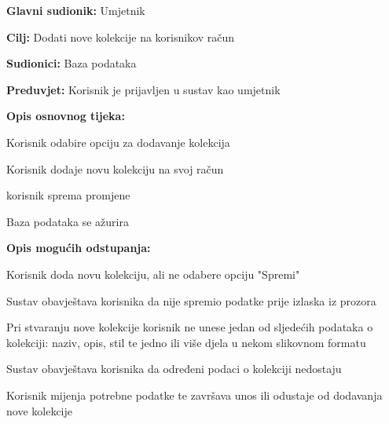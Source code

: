 					\noindent {}
					\begin{packed_item}
						
						\item \textbf{Glavni sudionik: }Umjetnik
						\item  \textbf{Cilj:} Dodati nove kolekcije na korisnikov račun
						\item  \textbf{Sudionici:} Baza podataka
						\item  \textbf{Preduvjet:} Korisnik je prijavljen u sustav kao umjetnik
						\item  \textbf{Opis osnovnog tijeka:}
						
						\item[] \begin{packed_enum}
							
							\item Korisnik odabire opciju za dodavanje kolekcija
							\item Korisnik dodaje novu kolekciju na svoj račun
							\item korisnik sprema promjene
							\item Baza podataka se ažurira					
						\end{packed_enum}
						
						\item  \textbf{Opis mogućih odstupanja:}
						
						\item[] \begin{packed_item}
							
							\item[2.a] Korisnik doda novu kolekciju, ali ne odabere opciju "Spremi"
							\item[] \begin{packed_enum}
								
								\item Sustav obavještava korisnika da nije spremio podatke prije izlaska iz prozora
								
							\end{packed_enum}
						
							\item[2.b] Pri stvaranju nove kolekcije korisnik ne unese jedan od sljedećih podataka o kolekciji:
							naziv, opis, stil te jedno ili više djela u nekom slikovnom formatu
							\item[] \begin{packed_enum}
								
								\item Sustav obavještava korisnika da određeni podaci o kolekciji nedostaju
								\item Korisnik mijenja potrebne podatke te završava 
								unos ili odustaje od dodavanja nove kolekcije
							\end{packed_enum}
							
						\end{packed_item}
					\end{packed_item}
					

